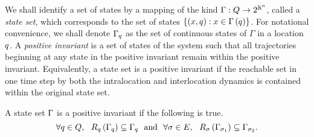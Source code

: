 We shall identify a set of states by a mapping of the kind
$\Gamma:Q\rightarrow 2^{\mathbb{R}^n}$, called a \emph{state
set}, which corresponds to the set of states
$\left\{\left(x,q\right):x\in\Gamma\left(q\right)\right\}$.  For notational
convenience, we shall denote $\Gamma_q$ as the set of continuous
states of $\Gamma$ in a location $q$.  A \emph{positive invariant}
is a set of states of the system such that all trajectories beginning
at any state in the positive invariant remain within the positive
invariant.  Equivalently, a state set is a positive invariant if the
reachable set in one time step by both the intralocation and
interlocation dynamics is contained within the original state set.
\begin{definition}
A state set $\Gamma$ is a positive invariant if
the following is true.
\[
 \forall q\in Q,~~R_{q}\left(\Gamma_q\right) \subseteq \Gamma_q~\label{eqn:pi1}~\text{and}~~
 \forall\sigma\in E,~~R_{\sigma}\left(\Gamma_{\sigma_{1}}\right) \subseteq
  \Gamma_{\sigma_{2}}.
\]
\end{definition}
